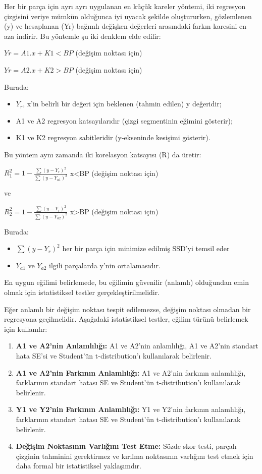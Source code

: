 \documentclass[12pt,twoside]{deuthesis}
\begin{document}
Her bir parça için ayrı ayrı uygulanan en küçük kareler yöntemi, iki regresyon çizgisini veriye mümkün olduğunca iyi uyacak şekilde oluştururken, gözlemlenen (y) ve hesaplanan (Yr) bağımlı değişken değerleri arasındaki farkın karesini en aza indirir. Bu yöntemle şu iki denklem elde edilir:

\(Yr = A1.x+K1 <BP\) (değişim noktası için)

\(Yr = A2.x+K2 >BP\) (değişim noktası için)

Burada:

\begin{itemize}
\item $Y_{r}$, x'in belirli bir değeri için beklenen (tahmin edilen) y değeridir;
\item A1 ve A2 regresyon katsayılarıdır (çizgi segmentinin eğimini gösterir);
\item K1 ve K2 regresyon sabitleridir (y-ekseninde kesişimi gösterir).
\end{itemize}

Bu yöntem aynı zamanda iki korelasyon katsayısı (R) da üretir:

\(R_{1}^{2}=1-{\frac {\sum (y-Y_{r})^{2}}{\sum (y-Y_{a1})^{2}}}\) x\textless BP (değişim noktası için)

ve

\(R_{2}^{2}=1-{\frac {\sum (y-Y_{r})^{2}}{\sum (y-Y_{a2})^{2}}}\) x\textgreater BP (değişim noktası için)

Burada:

\begin{itemize}
\item $\sum (y-Y_{r})^{2}$  her bir parça için minimize edilmiş SSD'yi temsil eder
\item $Y_{a1}$ ve $Y_{a2}$ ilgili parçalarda y'nin ortalamasıdır.
\end{itemize}

En uygun eğilimi belirlemede, bu eğilimin güvenilir (anlamlı) olduğundan emin olmak için istatistiksel testler gerçekleştirilmelidir.

Eğer anlamlı bir değişim noktası tespit edilemezse, değişim noktası olmadan bir regresyona geçilmelidir. Aşağıdaki istatistiksel testler, eğilim türünü belirlemek için kullanılır:

\begin{enumerate}
\item\textbf{A1 ve A2'nin Anlamlılığı:} A1 ve A2'nin anlamlılığı, A1 ve A2'nin standart hata SE'si ve Student'ün t-distribution'ı kullanılarak belirlenir.
\item\textbf{A1 ve A2'nin Farkının Anlamlılığı:} A1 ve A2'nin farkının anlamlılığı, farklarının standart hatası SE ve Student'ün t-distribution'ı kullanılarak belirlenir.
\item\textbf{Y1 ve Y2'nin Farkının Anlamlılığı:} Y1 ve Y2'nin farkının anlamlılığı, farklarının standart hatası SE ve Student'ün t-distribution'ı kullanılarak belirlenir.
\item\textbf{Değişim Noktasının Varlığını Test Etme:} Sözde skor testi, parçalı çizginin tahminini gerektirmez ve kırılma noktasının varlığını test etmek için daha formal bir istatistiksel yaklaşımdır.
\end{enumerate}
\end{document}
